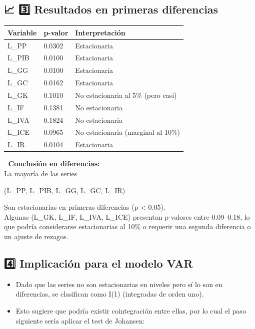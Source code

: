 \documentclass[
  spanish,
  letterpaper,
  DIV=11,
  numbers=noendperiod]{scrartcl}
\begin{document}
\subsection{\texorpdfstring{📈 \textbf{3️⃣ Resultados en primeras
diferencias}}{📈 3️⃣ Resultados en primeras diferencias}}\label{resultados-en-primeras-diferencias}

\begin{longtable}[]{@{}lll@{}}
\toprule\noalign{}
Variable & p-valor & Interpretación \\
\midrule\noalign{}
\endhead
\bottomrule\noalign{}
\endlastfoot
L\_PP & 0.0302 & Estacionaria \\
L\_PIB & 0.0100 & Estacionaria \\
L\_GG & 0.0100 & Estacionaria \\
L\_GC & 0.0162 & Estacionaria \\
L\_GK & 0.1010 & No estacionaria al 5\% (pero casi) \\
L\_IF & 0.1381 & No estacionaria \\
L\_IVA & 0.1824 & No estacionaria \\
L\_ICE & 0.0965 & No estacionaria (marginal al 10\%) \\
L\_IR & 0.0104 & Estacionaria \\
\end{longtable}

🔹 \textbf{Conclusión en diferencias:}\\
La mayoría de las series

(L\_PP, L\_PIB, L\_GG, L\_GC, L\_IR)

Son estacionarias en primeras diferencias (p \textless{} 0.05).\\
Algunas (L\_GK, L\_IF, L\_IVA, L\_ICE) presentan p-valores entre
0.09--0.18, lo que podría considerarse estacionarias al 10\% o requerir
una segunda diferencia o un ajuste de rezagos.

\subsection{\texorpdfstring{\textbf{4️⃣ Implicación para el modelo
VAR}}{4️⃣ Implicación para el modelo VAR}}\label{implicaciuxf3n-para-el-modelo-var}

\begin{itemize}
\item
  Dado que las series no son estacionarias en niveles pero sí lo son en
  diferencias, se clasifican como I(1) (integradas de orden uno).
\item
  Esto sugiere que podría existir cointegración entre ellas, por lo cual
  el paso siguiente sería aplicar el test de Johansen:
\end{itemize}
\end{document}
